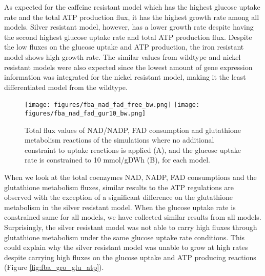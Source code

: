 As expected for the caffeine resistant model which has the highest glucose uptake rate and the total ATP production flux, it has the highest growth rate among all models. Silver resistant model, however, has a lower growth rate despite having the second highest glucose uptake rate and total ATP production flux. Despite the low fluxes on the glucose uptake and ATP production, the iron resistant model shows high growth rate. The similar values from wildtype and nickel resistant models were also expected since the lowest amount of gene expression information was integrated for the nickel resistant model, making it the least differentiated model from the wildtype.

\begin{figure}[H]
  \begin{center}
  \texttt{[image: figures/fba\_nad\_fad\_free\_bw.png]}
  \baselineskip
  \texttt{[image: figures/fba\_nad\_fad\_gur10\_bw.png]}
  \caption[Total flux values of NAD/NADP, FAD consumption and glutathione metabolism reactions of the simulations where  no additional constraint to uptake reactions is applied (TOP), and the glucose uptake rate is constrained to 10 mmol/gDWh (BOTTOM), for each model]{Total flux values of NAD/NADP, FAD consumption and glutathione metabolism reactions of the simulations where  no additional constraint to uptake reactions is applied (A), and the glucose uptake rate is constrained to 10 mmol/gDWh (B), for each model.}
  \label{fig:fba_nad_fad}
  \end{center}
\end{figure}

When we look at the total coenzymes NAD, NADP, FAD consumptions and the glutathione metabolism fluxes, similar results to the ATP regulations are observed with the exception of a significant difference on the glutathione metabolism in the silver resistant model. When the glucose uptake rate is constrained same for all models, we have collected similar results from all models. Surprisingly, the silver resistant model was not able to carry high fluxes through glutathione metabolism under the same glucose uptake rate conditions. This could explain why the silver resistant model was unable to grow at high rates despite carrying high fluxes on the glucose uptake and ATP producing reactions (Figure \ref{fig:fba_gro_glu_atp}).


